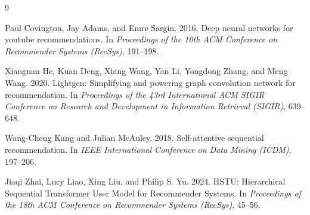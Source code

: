 \documentclass[11pt,a4paper]{article}
\begin{document}
\begin{thebibliography}{9}

Paul Covington, Jay Adams, and Emre Sargin. 2016.
\newblock Deep neural networks for youtube recommendations.
\newblock In {\em Proceedings of the 10th ACM Conference on Recommender Systems (RecSys)}, 191--198.

Xiangnan He, Kuan Deng, Xiang Wang, Yan Li, Yongdong Zhang, and Meng Wang. 2020.
\newblock Lightgcn: Simplifying and powering graph convolution network for recommendation.
\newblock In {\em Proceedings of the 43rd International ACM SIGIR Conference on Research and Development in Information Retrieval (SIGIR)}, 639--648.

Wang-Cheng Kang and Julian McAuley. 2018.
\newblock Self-attentive sequential recommendation.
\newblock In {\em IEEE International Conference on Data Mining (ICDM)}, 197--206.

Jiaqi Zhai, Lucy Liao, Xing Liu, and Philip S. Yu. 2024.
\newblock HSTU: Hierarchical Sequential Transformer User Model for Recommender Systems.
\newblock In {\em Proceedings of the 18th ACM Conference on Recommender Systems (RecSys)}, 45--56.

\end{thebibliography}
\end{document}
